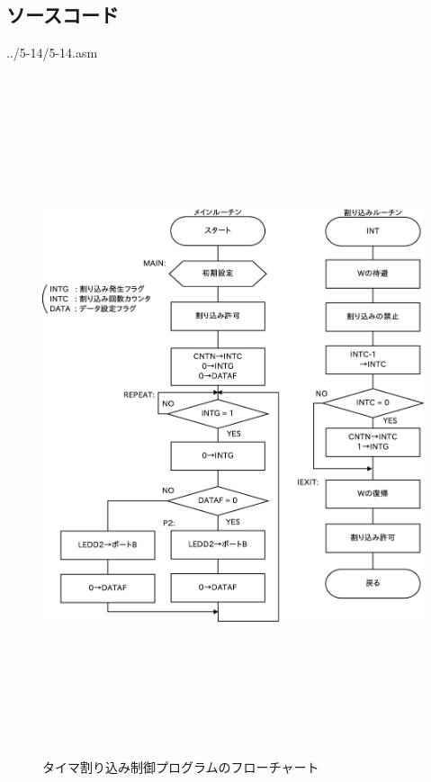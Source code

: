 \documentclass[a4paper,12pt]{ujarticle}
\begin{document}
  \subsection{ソースコード}
  \begin{lstinputlisting}[basicstyle=\ttfamily\footnotesize, frame=single,numbers=left]
   {../5-14/5-14.asm}
  \end{lstinputlisting}
  \begin{figure}[htbp]
    \begin{center}
     \includegraphics[height=200mm]{Diagram5-14.eps}
    \end{center}
   \caption{タイマ割り込み制御プログラムのフローチャート}
   \label{fig:flow_5-14}
  \end{figure}

  \clearpage
\end{document}

